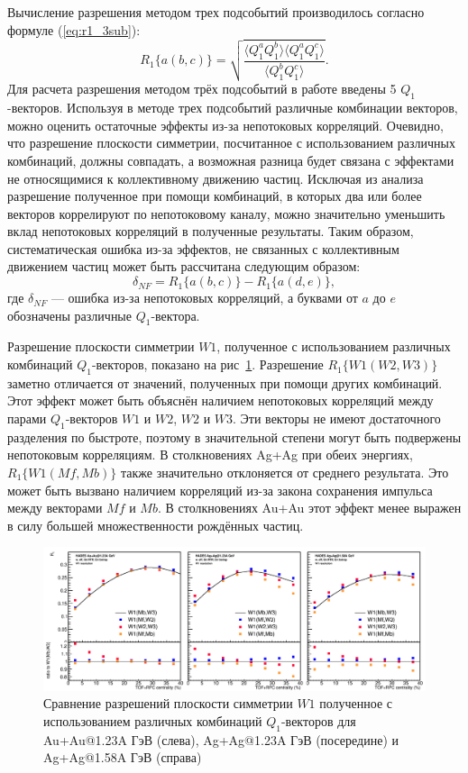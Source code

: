 Вычисление разрешения методом трех подсобытий производилось согласно формуле (\ref{eq:r1_3sub}):
\begin{equation}
    R_1\{a(b,c)\}  =  \sqrt { \frac{ \langle Q_1^a Q_1^b \rangle \langle Q_1^a Q_1^c \rangle }{ \langle Q_1^b Q_1^c \rangle} }.
\end{equation}
Для расчета разрешения методом трёх подсобытий в работе введены 5 $Q_1$-векторов. 
Используя в методе трех подсобытий различные комбинации векторов, можно оценить остаточные эффекты из-за непотоковых корреляций. 
Очевидно, что разрешение плоскости симметрии, посчитанное с использованием различных комбинаций, должны совпадать, а возможная разница будет связана с эффектами не относящимися к коллективному движению частиц.
Исключая из анализа разрешение полученное при помощи комбинаций, в которых два или более векторов коррелируют по непотоковому каналу, можно значительно уменьшить вклад непотоковых корреляций в полученные результаты.
Таким образом, систематическая ошибка из-за эффектов, не связанных с коллективным движением частиц может быть рассчитана следующим образом:
\begin{equation}
    \delta_{NF} = R_1\{a(b,c)\} - R_1\{a(d,e)\},
\end{equation}
где $\delta_{NF}$ --- ошибка из-за непотоковых корреляций, а буквами от $a$ до $e$ обозначены различные $Q_1$-вектора.

Разрешение плоскости симметрии $W1$, полученное с использованием различных комбинаций $Q_1$-векторов, показано на рис~\ref{fig:hades_w1_combinations}.
Разрешение $R_1\{W1(W2,W3)\}$ заметно отличается от значений, полученных при помощи других комбинаций. 
Этот эффект может быть объяснён наличием непотоковых корреляций между парами $Q_1$-векторов $W1$ и $W2$, $W2$ и $W3$.
Эти векторы не имеют достаточного разделения по быстроте, поэтому в значительной степени могут быть подвержены непотоковым корреляциям. 
В столкновениях Ag+Ag при обеих энергиях, $R_1\{W1(Mf,Mb)\}$ также значительно отклоняется от среднего результата. 
Это может быть вызвано наличием корреляций из-за закона сохранения импульса между векторами $Mf$ и $Mb$. 
В столкновениях Au+Au этот эффект менее выражен в силу большей множественности рождённых частиц.
%
\begin{figure}[ht]
\begin{center}
\includegraphics[width=0.75\linewidth]{images/W1_combinations.png}
\caption{Сравнение разрешений плоскости симметрии $W1$ полученное с использованием различных комбинаций $Q_1$-векторов для Au+Au@1.23A ГэВ (слева), Ag+Ag@1.23A ГэВ (посередине) и Ag+Ag@1.58A ГэВ (справа)}
\label{fig:hades_w1_combinations}
\end{center}
\end{figure}

